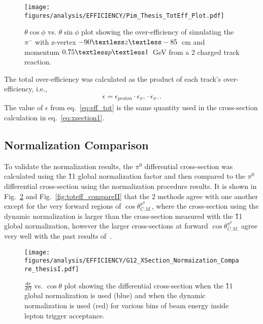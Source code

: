 \begin{figure}[h!]\begin{center}
\texttt{[image: \\figures/analysis/EFFICIENCY/Pim\_Thesis\_TotEff\_Plot.pdf]}
\caption[$\theta \cos\phi$ vs. $\theta \sin\phi$ plot showing the over-efficiency of simulating the $\pi^-$ with z-vertex $-90\textless z\textless-85$~cm and momentum $0.75\textless p \textless 1$~GeV from a 2 charged track reaction]{\label{fig:toteff_pim} $\theta \cos\phi$ vs. $\theta \sin\phi$ plot showing the over-efficiency of simulating the $\pi^-$ with z-vertex $-90\textless z\textless-85$~cm and momentum $0.75\textless p \textless 1$~GeV from a 2 charged track reaction.}
\end{center}\end{figure}
%
The total over-efficiency was calculated as the product of each track's over-efficiency, i.e.,
\begin{align}\label{eq:eff_tot}
\epsilon = \epsilon_{proton}\cdot\epsilon_{\pi^+}\cdot\epsilon_{\pi^-}.
\end{align}
The value of $\epsilon$ from eq.~\ref{eq:eff_tot} is the same quantity used in the cross-section calculation in eq.~\ref{eq:xsection1}.
\FloatBarrier
%
\subsection{Normalization Comparison}
To validate the  normalization results, the  $\pi^0$ differential cross-section was calculated using the \G11 global normalization factor and then compared to the  $\pi^0$ differential cross-section using the  normalization procedure results. It is shown in Fig.~\ref{fig:toteff_compareI} and Fig.~\ref{fig:toteff_compareII} that the 2 methods agree with one another except for the very forward regions of $\cos\theta^{\pi^0}_{C.M.}$, where the cross-section using the dynamic normalization is larger than the cross-section measured with the \G11 global normalization, however the larger cross-sections at forward $\cos\theta^{\pi^0}_{C.M.}$ agree very well with the past results of~\cite{ELSA11}.

\begin{figure}[h!]\begin{center}
\texttt{[image: \\figures/analysis/EFFICIENCY/G12\_XSection\_Normaization\_Compare\_thesisI.pdf]}
\caption[$\frac{d \sigma}{d \Omega}$ vs. $\cos \theta$ plot showing the  \piz differential cross-section when the \G11 global normalization is used (blue) and when the  dynamic normalization is used (red) for various bins of beam energy inside lepton trigger acceptance]{\label{fig:toteff_compareI} $\frac{d \sigma}{d \Omega}$ vs. $\cos \theta$ plot showing the  \piz differential cross-section when the \G11 global normalization is used (blue) and when the  dynamic normalization is used (red) for various bins of beam energy inside lepton trigger acceptance.}
\end{center}\end{figure}

